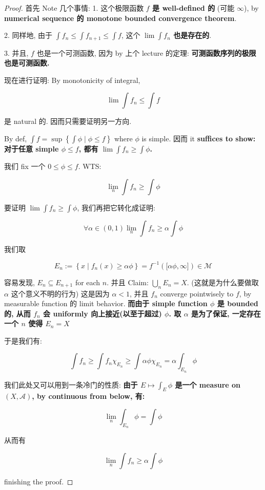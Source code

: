 \documentclass{qlnotes-export}
\begin{document}
\begin{proof}

首先 Note 几个事情: 1. 这个极限函数 \textbf{\(f\) 是 well-defined 的} (可能 \(\infty\)), by \textbf{numerical sequence 的 monotone bounded convergence theorem}.

2. 同样地, 由于 \(\int f_{n} \leq \int f_{n + 1} \leq \int f\), 这个 \textbf{\(\lim\int f_{n}\) 也是存在的}.

3. 并且, \(f\) 也是一个可测函数, 因为 by 上个 lecture 的定理: \textbf{可测函数序列的极限也是可测函数.}

现在进行证明: By monotonicity of integral,

\[\lim\int f_{n} \leq \int f\]

是 natural 的. 因而只需要证明另一方向.

By def, \(\int f = \sup\left\{ {\int\phi \mid \phi \leq f} \right\}\) where \(\phi\) is simple. 因而 it \textbf{suffices to show: 对于任意 simple \(\phi \leq f\), 都有 \(\lim\int f_{n} \geq \int\phi\).}

我们 fix 一个 \(0 \leq \phi \leq f\). WTS:

\[\lim\limits_{n}\int f_{n} \geq \int\phi\]

要证明 \(\lim\int f_{n} \geq \int\phi\), 我们再把它转化成证明:

\[\forall\alpha \in (0,1)\lim\limits_{n}\int f_{n} \geq \alpha\int\phi\]

我们取

\[E_{n} := \left\{ {x \mid f_{n}(x) \geq \alpha\phi} \right\} = f^{- 1}(\lbrack\alpha\phi,\infty\rbrack) \in \mathcal{M}\]

容易发现, \(E_{n} \subseteq E_{n + 1}\) for each \(n\). 并且 Claim: \(\bigcup_{n}E_{n} = X\). (这就是为什么要做取 \(\alpha\) 这个意义不明的行为) 这是因为 \(\alpha < 1\), 并且 \(f_{n}\) converge pointwisely to \(f\), by measurable function 的 limit behavior. \textbf{而由于 simple function \(\phi\) 是 bounded 的, 从而 \(f_{n}\) 会 uniformly 向上接近(以至于超过) \(\phi\). 取 \(\alpha\) 是为了保证, 一定存在一个 \(n\) 使得 \(E_{n} = X\)}

于是我们有:

\[\int f_{n} \geq \int f_{n}\chi_{E_{n}} \geq \int\alpha\phi\chi_{E_{n}} = \alpha\int_{E_{n}}\phi\]

我们此处又可以用到一条冷门的性质: \textbf{由于 \(E\mapsto\int_{E}\phi\) 是一个 measure on \((X,\mathcal{A})\), by continuous from below, 有:}

\[\lim\limits_{n}\int_{E_{n}}\phi = \int\phi\]

从而有

\[\lim\limits_{n}\int f_{n} \geq \alpha\int\phi\]

finishing the proof.

\end{proof}
\end{document}
